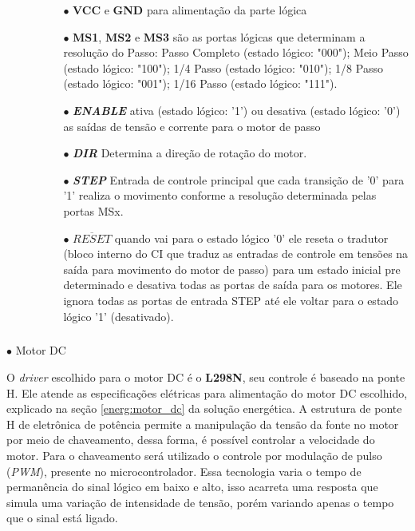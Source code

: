     \begin{itemize}
        \item[ ]
        \begin{itemize}
            \item[ ]
            \begin{itemize}
                \item[$\bullet$] \textbf{VCC} e \textbf{GND} para alimentação da parte lógica
                \item[$\bullet$] \textbf{MS1}, \textbf{MS2} e \textbf{MS3} são as portas lógicas que determinam a resolução do Passo: Passo Completo (estado lógico: "000"); Meio Passo (estado lógico: "100"); 1/4 Passo (estado lógico: "010"); 1/8 Passo (estado lógico: "001");  1/16 Passo (estado lógico: "111").
                \item[$\bullet$] \textbf{\textit{ENABLE}} ativa (estado lógico: '1') ou desativa (estado lógico: '0') as saídas de tensão  e corrente para o motor de passo
                \item[$\bullet$] \textbf{\textit{DIR}} Determina a direção de rotação do motor.
                \item[$\bullet$] \textbf{\textit{STEP}} Entrada de controle principal que cada transição de '0' para '1' realiza o movimento conforme a resolução determinada pelas portas MSx.
                \item[$\bullet$] \textbf{$\overline{RESET}$} quando vai para o estado lógico '0' ele reseta o tradutor (bloco interno do CI que traduz as entradas de controle em tensões na saída para movimento do motor de passo) para um estado inicial pre determinado e desativa todas as portas de saída para os motores. Ele ignora todas as portas de entrada STEP até ele voltar para o estado lógico '1' (desativado).
            \end{itemize}
        \end{itemize}
    \end{itemize}
    
    \subparagraph*{} $\bullet$ Motor DC
    
    O \textit{driver} escolhido para o motor DC é o \textbf{L298N}, seu controle é baseado na ponte H. Ele atende as especificações elétricas para alimentação do motor DC escolhido, explicado na seção \ref{energ:motor_dc} da solução energética. A estrutura de ponte H de eletrônica de potência permite a manipulação da tensão da fonte no motor por meio de chaveamento, dessa forma, é possível controlar a velocidade do motor. Para o chaveamento será utilizado o controle por modulação de pulso (\textit{PWM}), presente no microcontrolador. Essa tecnologia varia o tempo de permanência do sinal lógico em baixo e alto, isso acarreta uma resposta que simula uma variação de intensidade de tensão, porém variando apenas o tempo que o sinal está ligado.  
    
